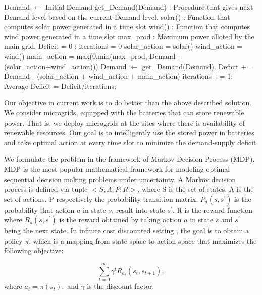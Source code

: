 \documentclass[conference]{IEEEtran}
\begin{document}
\begin{algorithm}
\caption{}
\label{greedy}
\begin{algorithmic}[1]
	\State Demand $\leftarrow$ Initial Demand
    \State get\_Demand(Demand) : Procedure that gives next Demand level based on the current Demand level.
    \State solar() : Function that computes solar power generated in a time slot
    \State wind() : Function that computes wind power generated in a time slot
    \State max\_prod : Maximum power alloted by the main grid.
    \State Deficit = 0 ; iterations = 0
     \State solar\_action = solar()
     \State wind\_action = wind()
     \State main\_action = max(0,min(max\_prod, Demand - (solar\_action+wind\_action)))
     \State Demand $\leftarrow$ get\_Demand(Demand).
     \State Deficit += Demand - (solar\_action + wind\_action + main\_action)
     \State iterations += 1;
    \EndProcedure
    \State Average Deficit = Deficit/iterations;
    
\end{algorithmic}
\end{algorithm}


Our objective in current work is to do better than the above described solution. We consider microgrids, equipped with the batteries that can store renewable power. That is, we deploy microgrids at the sites where there is availability of renewable resources. Our goal is to intelligently use the stored power in batteries and take optimal action at every time slot to minimize the demand-supply deficit.

We formulate the problem in the framework of Markov Decision Process (MDP). MDP \cite{sutton} is the most popular mathematical framework for modeling optimal sequential decision making problems under uncertainty. A Markov decision process is defined via tuple $< S; A; P;R >$, where S is the set of states. A is the set of actions. P respectively the probability transition matrix. $P_{a}(s,s^{'})$ is the probability that action $a$ in state $s$, result into state $s^{'}$. R is the reward function where $R_{a}(s,s^{'})$ is the reward obtained by taking action $a$ in state $s$ and $s^{'}$ being the next state. In infinite cost discounted setting \cite{vol1}, the goal is to obtain a policy $\pi$, which is a mapping from state space to action space that maximizes the following objective:

\begin{equation}
\sum_{t = 0}^{\infty} \gamma^{t}R_{a_{t}}(s_{t},s_{t+1}),
\end{equation}
where $a_{t} = \pi(s_{t}),$ and $\gamma$ is the discount factor.
\end{document}
